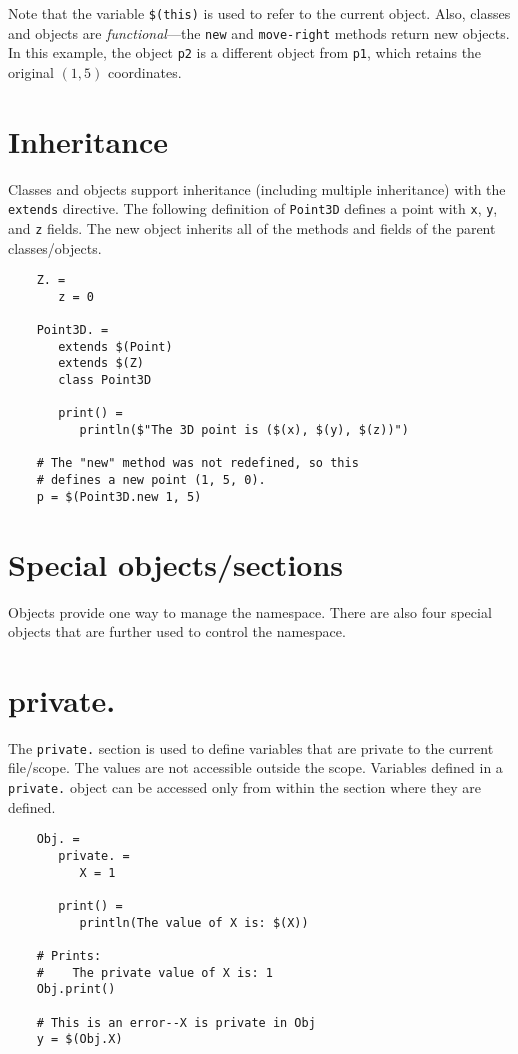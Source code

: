Note that the variable \verb+$(this)+ is used to refer to the current object.  Also, classes and
objects are \emph{functional}---the \verb+new+ and \verb+move-right+ methods return new objects.  In
this example, the object \verb+p2+ is a different object from \verb+p1+, which retains the original
$(1, 5)$ coordinates.

\section{Inheritance}

Classes and objects support inheritance (including multiple inheritance) with the \verb+extends+
directive.  The following definition of \verb+Point3D+ defines a point with \verb+x+, \verb+y+, and
\verb+z+ fields.  The new object inherits all of the methods and fields of the parent classes/objects.

\begin{verbatim}
    Z. =
       z = 0

    Point3D. =
       extends $(Point)
       extends $(Z)
       class Point3D

       print() =
          println($"The 3D point is ($(x), $(y), $(z))")

    # The "new" method was not redefined, so this
    # defines a new point (1, 5, 0).
    p = $(Point3D.new 1, 5)
\end{verbatim}

\section{Special objects/sections}

Objects provide one way to manage the \OMake{} namespace.  There are also four special objects that are
further used to control the namespace.

\section{private.}
\label{section:private}

The \verb+private.+ section is used to define variables that are private to the current file/scope.
The values are not accessible outside the scope.  Variables defined in a \verb+private.+ object can
be accessed only from within the section where they are defined.

\begin{verbatim}
    Obj. =
       private. =
          X = 1

       print() =
          println(The value of X is: $(X))

    # Prints:
    #    The private value of X is: 1
    Obj.print()

    # This is an error--X is private in Obj
    y = $(Obj.X)
\end{verbatim}

